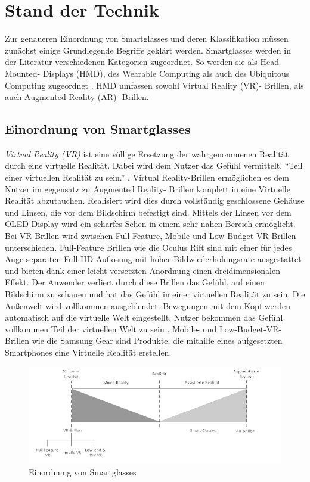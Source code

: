 \chapter{Stand der Technik}
Zur genaueren Einordnung von Smartglasses und deren Klassifikation müssen zunächst einige Grundlegende Begriffe geklärt werden. Smartglasses werden in der Literatur verschiedenen Kategorien zugeordnet. So werden sie als Head-Mounted- Displays (HMD), des Wearable Computing als auch des Ubiquitous Computing zugeordnet \cite[S.~20]{}. HMD umfassen sowohl Virtual Reality (VR)- Brillen, als auch Augmented Reality (AR)- Brillen.

\section{Einordnung von Smartglasses}
\emph{Virtual Reality (VR)} ist eine völlige Ersetzung der wahrgenommenen Realität durch eine virtuelle Realität. Dabei wird dem Nutzer das Gefühl vermittelt, \enquote{Teil einer virtuellen Realität zu sein.} \cite[S.~22]{ThomasDirkMetzgerHelmutNiegemannHrsg2018}. Virtual Reality-Brillen ermöglichen es dem Nutzer im gegensatz zu Augmented Reality- Brillen komplett in eine Virtuelle Realität abzutauchen. Realisiert wird dies durch vollständig geschlossene Gehäuse und Linsen, die vor dem Bildschirm befestigt sind. Mittels der Linsen vor dem OLED-Display wird ein scharfes Sehen in einem sehr nahen Bereich ermöglicht. Bei VR-Brillen wird zwischen Full-Feature, Mobile und Low-Budget VR-Brillen unterschieden. Full-Feature Brillen wie die Oculus Rift sind mit einer für jedes Auge separaten Full-HD-Auflösung mit hoher Bildwiederholungsrate ausgestattet und bieten dank einer leicht versetzten Anordnung einen dreidimensionalen Effekt. Der Anwender verliert durch diese Brillen das Gefühl, auf einen Bildschirm zu schauen und hat das Gefühl in einer virtuellen Realität zu sein. Die Außenwelt wird vollkommen ausgeblendet. Bewegungen mit dem Kopf werden automatisch auf die virtuelle Welt eingestellt. Nutzer bekommen das Gefühl vollkommen Teil der virtuellen Welt zu sein \cite[S.~22ff]{ThomasDirkMetzgerHelmutNiegemannHrsg2018}. Mobile- und Low-Budget-VR-Brillen wie die Samsung Gear sind Produkte, die mithilfe eines aufgesetzten Smartphones eine Virtuelle Realität erstellen.
\begin{figure}[htbp]
    \centering
    \includegraphics[width=1\textwidth]{data/bilder/VRvsAR.pdf}
    \caption{Einordnung von Smartglasses \cite{ThomasDirkMetzgerHelmutNiegemannHrsg2018}}
    \label{fig:mesh1}
\end{figure}
